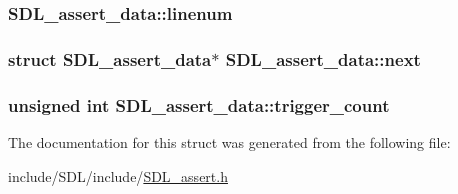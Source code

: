 \hypertarget{struct_s_d_l__assert__data_aec495b21ff71db1226eff0e6d5db333a}{
\subsubsection[{linenum}]{ S\-D\-L\-\_\-assert\-\_\-data\-::linenum}}\label{struct_s_d_l__assert__data_aec495b21ff71db1226eff0e6d5db333a}
\hypertarget{struct_s_d_l__assert__data_ab0beb52f0ae9d8b88dd90df4ad4b07ff}{
\subsubsection[{next}]{\setlength{\rightskip}{0pt plus 5cm}struct {\bf S\-D\-L\-\_\-assert\-\_\-data}$\ast$ S\-D\-L\-\_\-assert\-\_\-data\-::next}}\label{struct_s_d_l__assert__data_ab0beb52f0ae9d8b88dd90df4ad4b07ff}
\hypertarget{struct_s_d_l__assert__data_ac3e02d5e1ed06d11f7e49b6d652655d6}{
\subsubsection[{trigger\-\_\-count}]{\setlength{\rightskip}{0pt plus 5cm}unsigned {\bf int} S\-D\-L\-\_\-assert\-\_\-data\-::trigger\-\_\-count}}\label{struct_s_d_l__assert__data_ac3e02d5e1ed06d11f7e49b6d652655d6}


The documentation for this struct was generated from the following file\-:\begin{DoxyCompactItemize}
\item 
include/\-S\-D\-L/include/\hyperlink{_s_d_l__assert_8h}{S\-D\-L\-\_\-assert.\-h}\end{DoxyCompactItemize}
